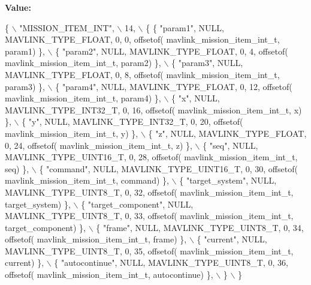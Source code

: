 {\bfseries Value\+:}
\begin{DoxyCode}
\{ \(\backslash\)
    \textcolor{stringliteral}{"MISSION\_ITEM\_INT"}, \(\backslash\)
    14, \(\backslash\)
    \{  \{ \textcolor{stringliteral}{"param1"}, NULL, MAVLINK_TYPE_FLOAT, 0, 0, offsetof(
      mavlink_mission_item_int_t, param1) \}, \(\backslash\)
         \{ \textcolor{stringliteral}{"param2"}, NULL, MAVLINK_TYPE_FLOAT, 0, 4, offsetof(
      mavlink_mission_item_int_t, param2) \}, \(\backslash\)
         \{ \textcolor{stringliteral}{"param3"}, NULL, MAVLINK_TYPE_FLOAT, 0, 8, offsetof(
      mavlink_mission_item_int_t, param3) \}, \(\backslash\)
         \{ \textcolor{stringliteral}{"param4"}, NULL, MAVLINK_TYPE_FLOAT, 0, 12, offsetof(
      mavlink_mission_item_int_t, param4) \}, \(\backslash\)
         \{ \textcolor{stringliteral}{"x"}, NULL, MAVLINK_TYPE_INT32_T, 0, 16, offsetof(
      mavlink_mission_item_int_t, x) \}, \(\backslash\)
         \{ \textcolor{stringliteral}{"y"}, NULL, MAVLINK_TYPE_INT32_T, 0, 20, offsetof(
      mavlink_mission_item_int_t, y) \}, \(\backslash\)
         \{ \textcolor{stringliteral}{"z"}, NULL, MAVLINK_TYPE_FLOAT, 0, 24, offsetof(
      mavlink_mission_item_int_t, z) \}, \(\backslash\)
         \{ \textcolor{stringliteral}{"seq"}, NULL, MAVLINK_TYPE_UINT16_T, 0, 28, offsetof(
      mavlink_mission_item_int_t, seq) \}, \(\backslash\)
         \{ \textcolor{stringliteral}{"command"}, NULL, MAVLINK_TYPE_UINT16_T, 0, 30, offsetof(
      mavlink_mission_item_int_t, command) \}, \(\backslash\)
         \{ \textcolor{stringliteral}{"target\_system"}, NULL, MAVLINK_TYPE_UINT8_T, 0, 32, offsetof(
      mavlink_mission_item_int_t, target\_system) \}, \(\backslash\)
         \{ \textcolor{stringliteral}{"target\_component"}, NULL, MAVLINK_TYPE_UINT8_T, 0, 33, offsetof(
      mavlink_mission_item_int_t, target\_component) \}, \(\backslash\)
         \{ \textcolor{stringliteral}{"frame"}, NULL, MAVLINK_TYPE_UINT8_T, 0, 34, offsetof(
      mavlink_mission_item_int_t, frame) \}, \(\backslash\)
         \{ \textcolor{stringliteral}{"current"}, NULL, MAVLINK_TYPE_UINT8_T, 0, 35, offsetof(
      mavlink_mission_item_int_t, current) \}, \(\backslash\)
         \{ \textcolor{stringliteral}{"autocontinue"}, NULL, MAVLINK_TYPE_UINT8_T, 0, 36, offsetof(
      mavlink_mission_item_int_t, autocontinue) \}, \(\backslash\)
         \} \(\backslash\)
\}
\end{DoxyCode}
\mbox{\label{mavlink__msg__mission__item__int_8h_ad645834c05de111f72f16a28ac8f7e0a}} 
